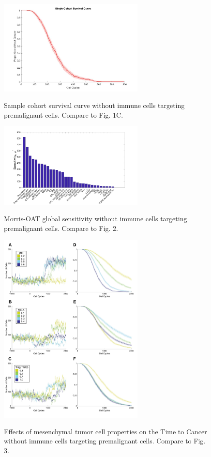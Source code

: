 \documentclass[11pt, a4paper, preprint]{article}
\begin{document}
\begin{figure}
\center
{\includegraphics[width=0.65\textwidth]{../Figs/Figure1/OneSurvivalCurve.jpg}}
\caption{
Sample cohort survival curve without immune cells targeting premalignant cells. Compare to Fig. 1C.
}
\label{fig:1c_first}
\end{figure}

\begin{figure}
\center
{\includegraphics[width=0.65\textwidth]{../Figs/Figure2/Figure2.jpg}}
\caption{
Morris-OAT global sensitivity without immune cells targeting premalignant cells. Compare to Fig. 2.
}
\label{fig:2_first}
\end{figure}

\begin{figure}
\center
{\includegraphics[width=0.65\textwidth]{../Figs/Figure3/Figure3_first.pdf}}
\caption{
Effects of mesenchymal tumor cell properties on the Time to Cancer without immune cells targeting premalignant cells. Compare to Fig. 3.
}
\label{fig:3_first}
\end{figure}
\end{document}
